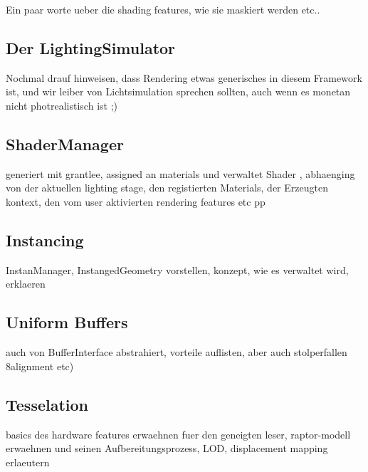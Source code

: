 
\label{sec:visualDomain}
	
Ein paar worte ueber die shading features, wie sie maskiert werden etc..

\subsection{Der LightingSimulator}
	Nochmal drauf hinweisen, dass Rendering etwas generisches in diesem Framework ist, und wir leiber von Lichtsimulation sprechen sollten, auch wenn es monetan nicht photrealistisch ist ;)
	

\subsection{ShaderManager}
	generiert mit grantlee, assigned an materials und verwaltet Shader , abhaenging von der aktuellen lighting stage, den registierten Materials,
	der Erzeugten kontext, den vom user aktivierten rendering features etc pp
	
\subsection{Instancing}
	InstanManager, InstangedGeometry vorstellen, konzept, wie es verwaltet wird, erklaeren
\subsection{Uniform Buffers}
	auch von BufferInterface abstrahiert, vorteile auflisten, aber auch stolperfallen 8alignment etc)
\subsection{Tesselation}
	basics des hardware features erwaehnen fuer den geneigten leser, raptor-modell erwaehnen und seinen Aufbereitungsprozess, LOD, displacement mapping erlaeutern
	
	  

\clearpage
